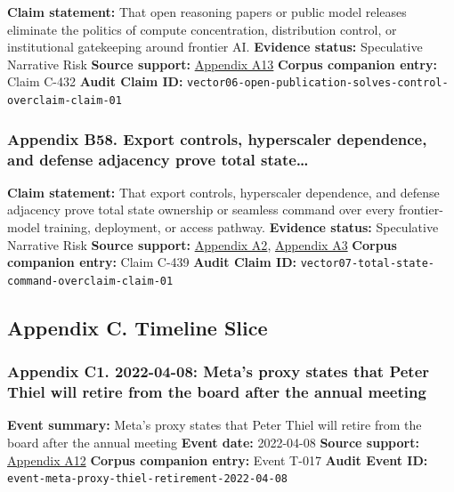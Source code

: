 \documentclass[
  american,
  11pt,
  letterpaper,
]{article}
\begin{document}
\textbf{Claim statement:} That open reasoning papers or public model
releases eliminate the politics of compute concentration, distribution
control, or institutional gatekeeping around frontier AI.
\textbf{Evidence status:} Speculative Narrative Risk \textbf{Source
support:}
\hyperref[ch-07-appendix-a13-deepseek-r1-incentivizing-reasoning-capability-in-llms-via-reinforcement-learning]{Appendix
A13} \textbf{Corpus companion entry:} Claim C-432 \textbf{Audit Claim
ID:}
\texttt{vector06-open-publication-solves-control-overclaim-claim-01}

\subsubsection{Appendix B58. Export controls, hyperscaler dependence,
and defense adjacency prove total
state\ldots{}}\label{ch-07-appendix-b58-export-controls-hyperscaler-dependence-and-defense-adjacency-prove-total-state}

\textbf{Claim statement:} That export controls, hyperscaler dependence,
and defense adjacency prove total state ownership or seamless command
over every frontier-model training, deployment, or access pathway.
\textbf{Evidence status:} Speculative Narrative Risk \textbf{Source
support:}
\hyperref[ch-07-appendix-a2-guidance-regarding-enforcement-of-license-requirements-for-advanced-computing-items-for-entities-headquartered-in-country-group-d-5-and-macau]{Appendix
A2},
\hyperref[ch-07-appendix-a3-amazon-and-anthropic-announce-strategic-collaboration-to-advance-generative-ai]{Appendix
A3} \textbf{Corpus companion entry:} Claim C-439 \textbf{Audit Claim
ID:} \texttt{vector07-total-state-command-overclaim-claim-01}

\subsection{Appendix C. Timeline
Slice}\label{appendix-c.-timeline-slice-7}

\subsubsection{Appendix C1. 2022-04-08: Meta's proxy states that Peter
Thiel will retire from the board after the annual
meeting}\label{ch-07-appendix-c1-2022-04-08-meta-s-proxy-states-that-peter-thiel-will-retire-from-the-board-after-the-annual-meeting}

\textbf{Event summary:} Meta's proxy states that Peter Thiel will retire
from the board after the annual meeting \textbf{Event date:} 2022-04-08
\textbf{Source support:}
\hyperref[ch-07-appendix-a12-meta-platforms-inc-2022-definitive-proxy-statement]{Appendix
A12} \textbf{Corpus companion entry:} Event T-017 \textbf{Audit Event
ID:} \texttt{event-meta-proxy-thiel-retirement-2022-04-08}
\end{document}
